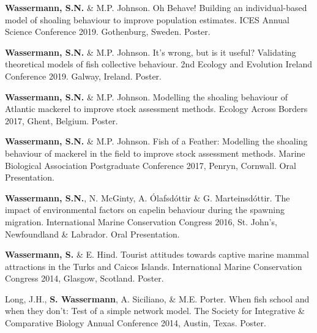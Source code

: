 \documentclass[a4paper]{deedy-resume} %
\begin{document}
\begin{flushleft}
\begin{tightitemize}
\item \textbf{Wassermann, S.N.} \& M.P. Johnson. Oh Behave! Building an individual-based model of shoaling behaviour to improve population estimates. ICES Annual Science Conference 2019. Gothenburg, Sweden. Poster.
\item \textbf{Wassermann, S.N.} \& M.P. Johnson. It's wrong, but is it useful? Validating theoretical models of fish collective behaviour. 2nd Ecology and Evolution Ireland Conference 2019. Galway, Ireland. Poster.
\item \textbf{Wassermann, S.N.} \& M.P. Johnson. Modelling the shoaling behaviour of Atlantic mackerel to improve stock assessment methods. Ecology Across Borders 2017, Ghent, Belgium. Poster.
\item \textbf{Wassermann, S.N.} \& M.P. Johnson. Fish of a Feather: Modelling the shoaling behaviour of mackerel in the field to improve stock assessment methods. Marine Biological Association Postgraduate Conference 2017, Penryn, Cornwall. Oral Presentation.
\item \textbf{Wassermann, S.N.}, N. McGinty, A. \'{O}lafsd\'{o}ttir \& G. Marteinsd\'{o}ttir. The impact of environmental factors on capelin behaviour during the spawning migration. International Marine Conservation Congress 2016, St. John's, Newfoundland \& Labrador. Oral Presentation.
\item \textbf{Wassermann, S.} \& E. Hind. Tourist attitudes towards captive marine mammal attractions in the Turks and Caicos Islands. International Marine Conservation Congress 2014, Glasgow, Scotland. Poster.
\item Long, J.H., \textbf{S. Wassermann}, A. Siciliano, \& M.E. Porter. When fish school and when they don't: Test of a simple network model. The Society for Integrative \& Comparative Biology Annual Conference 2014, Austin, Texas. Poster.
\end{tightitemize}

\sectionspace


\end{flushleft}



\newpage %

\end{document}
